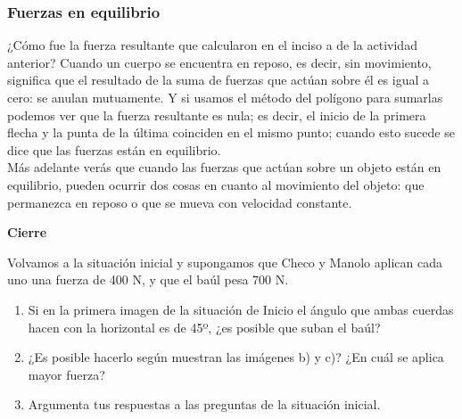 \documentclass[11pt]{book}
\begin{document}
\subsubsection{Fuerzas en equilibrio}
¿Cómo fue la fuerza resultante que calcularon en el inciso a de la actividad anterior?
Cuando un cuerpo se encuentra en reposo, es decir, sin movimiento, significa que el
resultado de la suma de fuerzas que actúan sobre él es igual a cero: se anulan mutuamente.
Y si usamos el método del polígono para sumarlas podemos ver que la fuerza resultante es
nula; es decir, el inicio de la primera flecha y la punta de la última coinciden en el
mismo punto; cuando esto sucede se dice que las fuerzas están en equilibrio.\\

Más adelante verás que cuando las fuerzas que actúan sobre un objeto están en equilibrio,
pueden ocurrir dos cosas en cuanto al movimiento del objeto: que permanezca en reposo o
que se mueva con velocidad constante.\\

\begin{boxF}
  \begin{center}\bfseries \color{colorrds} Cierre\end{center}

  Volvamos a la situación inicial y supongamos que Checo y Manolo aplican cada uno una
  fuerza de 400 N, y que el baúl pesa 700 N.
  \begin{enumerate}
    \item Si en la primera imagen de la situación de Inicio el ángulo que
          ambas cuerdas hacen con la horizontal es de 45º, ¿es posible que suban el baúl?
    \item ¿Es posible hacerlo según muestran las imágenes b) y c)?
          ¿En cuál se aplica mayor fuerza?
    \item Argumenta tus respuestas a las preguntas de la situación inicial.
  \end{enumerate}

\end{boxF}

\newpage
\end{document}
